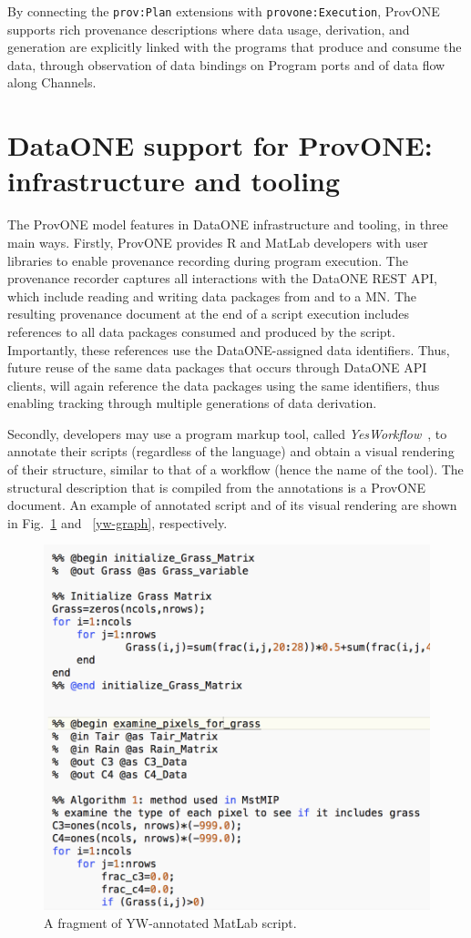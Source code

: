 \documentclass[a4paper]{llncs}
\begin{document}
By connecting the \texttt{prov:Plan} extensions with \texttt{provone:Execution}, ProvONE supports rich provenance descriptions where data usage, derivation, and generation are explicitly linked with the programs that produce and consume the data, through observation of data bindings on Program ports and of data flow along Channels.


\section{DataONE support for ProvONE:  infrastructure and tooling}

The ProvONE model features in DataONE infrastructure and tooling, in three main ways. 
%
Firstly, ProvONE provides R and MatLab developers with user libraries \cite{recordr,matlabdataone} to enable provenance recording during program execution. The provenance recorder captures all interactions with the DataONE REST API, which include reading and writing data packages from and to a MN.
The resulting provenance document at the end of a script execution includes references to all data packages consumed and produced by the script. 
Importantly, these references use the DataONE-assigned data identifiers. Thus, future reuse of the same data packages that occurs through DataONE API clients, will again reference the data packages using the same identifiers, thus enabling tracking through multiple generations of data derivation.

Secondly, developers may use a program markup tool, called \textit{YesWorkflow}~\cite{yesworkflow}, to annotate their scripts (regardless of the language) and obtain a visual rendering of their structure, similar to that of a workflow (hence the name of the tool). The structural description that is compiled from the annotations is a ProvONE document. 
An example of annotated script and of its visual rendering are shown in Fig.~\ref{script} and ~\ref{yw-graph}, respectively.

\begin{figure}
\centering 
\includegraphics[width=.5\textwidth]{MatLabYW-screenshot} 
\caption{A fragment of YW-annotated MatLab script.} 
 \label{script} 
 \end{figure}
\end{document}
